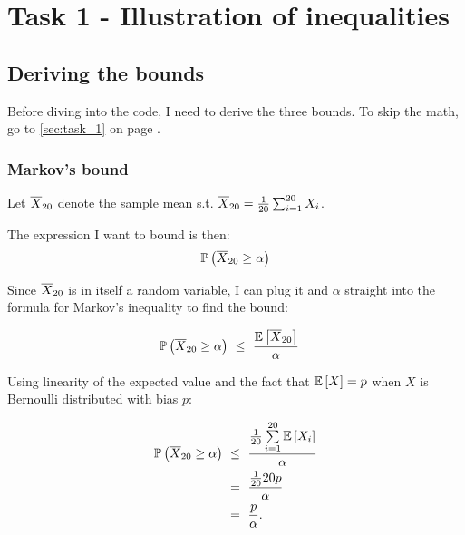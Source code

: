 \section{Task 1 - Illustration of inequalities}

\newcommand{\vxbar}{\frac{1}{20}\sum_{i = 1}^{20} X_i}
\newcommand{\xbar}{\bbar{X}_{20}}

\subsection{Deriving the bounds}

Before diving into the code, I need to derive the three bounds. To skip the
math, go to \cref{sec:task_1} on page \pageref{sec:task_1}.

\subsubsection{Markov's bound}


Let $\xbar$ denote the sample mean s.t. $\xbar = \tfrac{1}{20}\textstyle
\sum_{i = 1}^{20}X_i$.

The expression I want to bound is then:
\begin{align}
  \PP{\xbar \geq \alpha}\label{eq:bound_start}
\end{align}

Since $\xbar$ is in itself a random variable, I can plug it and $\alpha$
straight into the formula for Markov's inequality to find the bound:

\begin{align*}
  \PP{\xbar \geq \alpha} \ &\leq\ \frac{\EE{\xbar}}{\alpha}
\end{align*}

Using linearity of the expected value and the fact that $\mathbb E\left[X\right] = p$
when $X$ is Bernoulli distributed with bias $p$:

\begin{align*}
  \PP{\xbar \geq \alpha} \ &\leq\ \frac{\tfrac{1}{20}\sum\limits_{i =
  1}^{20}\E\left[X_i\right]}{\alpha}\\
                            &=\ \frac{\tfrac{1}{20}20p}{\alpha}\\
                            &=\ \frac{p}{\alpha}.
\end{align*}

